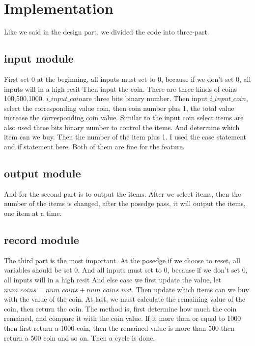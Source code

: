 \documentclass[12pt,a4paper]{article}
\begin{document}
\newpage

\section{Implementation}

Like we said in the design part, we divided the code into three-part.

\subsection{input module}

First set 0 at the beginning, all inputs must set to 0, because if we don't set 0, all inputs will in a high resit
Then input the coin. There are three kinds of coins 100,500,1000.
$i\_input\_coin $are three bits binary number. 
Then input $i\_input\_coin$, select the corresponding value coin, then coin number plus 1, the total value increase the corresponding coin value.
Similar to the input coin select items are also used three bits binary number to control the items. 
And determine which item can we buy.
Then the number of the item plus 1.
I used the case statement and if statement here.
Both of them are fine for the feature.

\subsection{output module}

And for the second part is to output the items. 
After we select items, then the number of the items is changed, after the posedge pass, it will output the items, one item at a time.

\subsection{record module}

The third part is the most important.
At the posedge if we choose to reset, all variables should be set 0.
And all inputs must set to 0, because if we don't set 0, all inputs will in a high resit
And else case we first update the value, let $num\_coins =num\_coins + num\_coins\_nxt$.
Then update which items can we buy with the value of the coin.
At last, we must calculate the remaining value of the coin, then return the coin.
The method is, first determine how much the coin remained, and compare it with the coin value.
If it more than or equal to 1000 then first return a 1000 coin, then the remained value is more than 500 then return a 500 coin and so on.
Then a cycle is done.  
\end{document}
